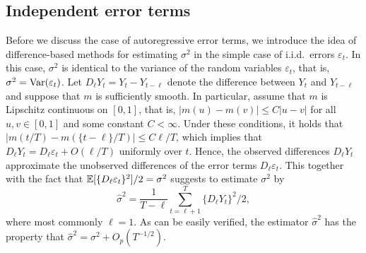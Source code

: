 

\subsection{Independent error terms}\label{subsec-error-var-iid} 


Before we discuss the case of autoregressive error terms, we introduce the idea of difference-based methods for estimating $\sigma^2$ in the simple case of i.i.d.\ errors $\varepsilon_t$. In this case, $\sigma^2$ is identical to the variance of the random variables $\varepsilon_t$, that is, $\sigma^2 = \textnormal{Var}(\varepsilon_t)$. Let $D_\ell Y_t = Y_t - Y_{t-\ell}$ denote the difference between $Y_t$ and $Y_{t-\ell}$ and suppose that $m$ is sufficiently smooth. In particular, assume that $m$ is Lipschitz continuous on $[0,1]$, that is, $|m(u) - m(v)| \le C|u - v|$ for all $u,v \in [0,1]$ and some constant $C < \infty$. Under these conditions, it holds that $|m(t/T) - m(\{t-\ell\}/T)| \le C \ell/T$, which implies that $D_\ell Y_t = D_\ell \varepsilon_t + O(\ell/T)$ uniformly over $t$. Hence, the observed differences $D_\ell Y_t$ approximate the unobserved differences of the error terms $D_\ell \varepsilon_t$. This together with the fact that $\mathbb{E}[ \{D_\ell \varepsilon_t\}^2]/2 = \sigma^2$ suggests to estimate $\sigma^2$ by 
\[ \widehat{\sigma}^2 = \frac{1}{T-\ell} \sum\limits_{t=\ell+1}^T \{ D_\ell Y_t \}^2 \big/ 2, \]
where most commonly $\ell = 1$. As can be easily verified, the estimator $\widehat{\sigma}^2$ has the property that $\widehat{\sigma}^2 = \sigma^2 + O_p(T^{-1/2})$. 


